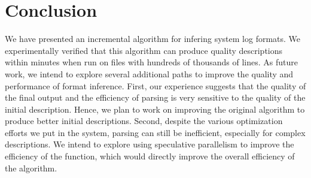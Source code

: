 \section{Conclusion}
\label{sec:conclude}
We have presented an incremental algorithm for infering system log
formats.  We experimentally verified that this algorithm can produce
quality descriptions within minutes when run on files with hundreds of
thousands of lines.  As future work, we intend to explore several
additional paths to improve the quality and performance of format
inference. First, our experience suggests that the quality of
the final output and the efficiency of parsing is very sensitive to
the quality of the initial description.  Hence, we plan to work on
improving the original \learnpads{} algorithm to produce better
initial descriptions. Second, despite the various optimization efforts
we put in the system, parsing can still be inefficient, especially for
complex descriptions.  We intend to explore using speculative
parallelism to improve the efficiency of the  function,
which would directly improve the overall efficiency of the algorithm.


 

